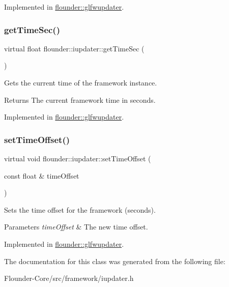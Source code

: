 Implemented in \hyperlink{classflounder_1_1glfwupdater_a7d37c7454419a6756c56b3a6412f6d20}{flounder\+::glfwupdater}.

\mbox{\label{classflounder_1_1iupdater_aab92d5e84c55e35d1b8a9a4f5628e3b4}} 
\subsubsection{\texorpdfstring{get\+Time\+Sec()}{getTimeSec()}}
{\footnotesize\ttfamily virtual float flounder\+::iupdater\+::get\+Time\+Sec (\begin{DoxyParamCaption}{ }\end{DoxyParamCaption})\hspace{0.3cm}{\ttfamily [pure virtual]}}



Gets the current time of the framework instance. 

\begin{DoxyReturn}{Returns}
The current framework time in seconds. 
\end{DoxyReturn}


Implemented in \hyperlink{classflounder_1_1glfwupdater_a01b583f6e4b5ae90eb9d74f931d80081}{flounder\+::glfwupdater}.

\mbox{\label{classflounder_1_1iupdater_a5ce1862ec2d0e6c4f61b026922379dd2}} 
\subsubsection{\texorpdfstring{set\+Time\+Offset()}{setTimeOffset()}}
{\footnotesize\ttfamily virtual void flounder\+::iupdater\+::set\+Time\+Offset (\begin{DoxyParamCaption}\item[{const float \&}]{time\+Offset }\end{DoxyParamCaption})\hspace{0.3cm}{\ttfamily [pure virtual]}}



Sets the time offset for the framework (seconds). 


\begin{DoxyParams}{Parameters}
{\em time\+Offset} & The new time offset. \\
\hline
\end{DoxyParams}


Implemented in \hyperlink{classflounder_1_1glfwupdater_a2cffca6ed4a79dd5d8cc658ca20c70ef}{flounder\+::glfwupdater}.



The documentation for this class was generated from the following file\+:\begin{DoxyCompactItemize}
\item 
Flounder-\/\+Core/src/framework/iupdater.\+h\end{DoxyCompactItemize}
